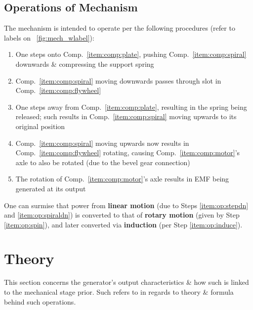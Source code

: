 \documentclass[conference]{ieeetran}
\newcommand{\figref}[1]{\figurename~\ref{#1}}
\newcommand{\compref}[1]{Comp.~\ref{#1}}
\begin{document}
\subsection{Operations of Mechanism}
The mechanism is intended to operate per the following procedures (refer to labels on \figref{fig:mech_wlabel}):
\begin{enumerate}
    \item\label{item:op:stepdn} One steps onto \compref{item:comp:plate}, pushing \compref{item:comp:spiral} downwards \& compressing the support spring
    \item\label{item:op:spiraldn} \compref{item:comp:spiral} moving downwards passes through slot in \compref{item:comp:flywheel}
    \item\label{item:op:stepup} One steps away from \compref{item:comp:plate}, resulting in the spring being released; such results in \compref{item:comp:spiral} moving upwards to its original position
    \item\label{item:op:spin} \compref{item:comp:spiral} moving upwards now results in \compref{item:comp:flywheel} rotating, causing \compref{item:comp:motor}'s axle to also be rotated (due to the bevel gear connection)
    \item\label{item:op:induce} The rotation of \compref{item:comp:motor}'s axle results in EMF being generated at its output
\end{enumerate}

One can surmise that power from \textbf{linear motion} (due to Steps \ref{item:op:stepdn} and \ref{item:op:spiraldn}) is converted to that of \textbf{rotary motion} (given by Step \ref{item:op:spin}), and later converted via \textbf{induction} (per Step \ref{item:op:induce}).


\section{Theory}
This section concerns the generator's output characteristics \& how such is linked to the mechanical stage prior. Such refers to \cite{industrial2} in regards to theory \& formula behind such operations.

\end{document}
